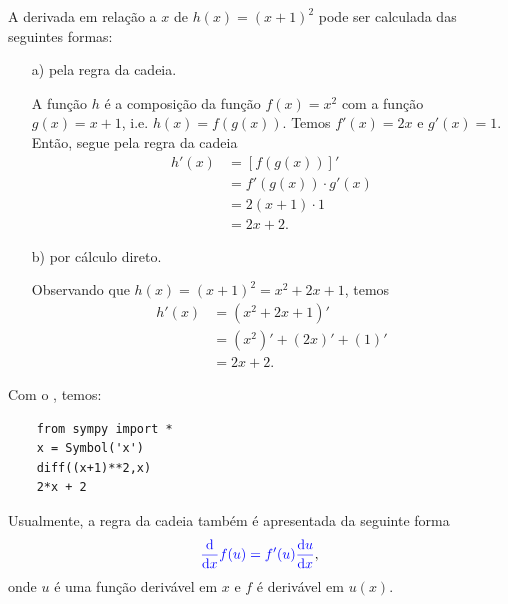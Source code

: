 \begin{ex}
  A derivada em relação a $x$ de $h(x) = (x+1)^2$ pode ser calculada das seguintes formas:
  \begin{enumerate}
  \item[a)] pela regra da cadeia.

    A função $h$ é a composição da função $f(x)=x^2$ com a função $g(x)=x+1$, i.e. $h(x) = f(g(x))$. Temos $f'(x)=2x$ e $g'(x)=1$. Então, segue pela regra da cadeia
    \begin{align}
      h'(x) &= [f(g(x))]' \\
            &= f'(g(x))\cdot g'(x) \\
            &= 2(x+1)\cdot 1 \\
            &= 2x+2.
    \end{align}

  \item[b)] por cálculo direto.

    Observando que $h(x)=(x+1)^2=x^2+2x+1$, temos
    \begin{align}
      h'(x) &= (x^2+2x+1)' \\
            &= (x^2)' + (2x)' + (1)' \\
            &= 2x + 2.
    \end{align}
  \end{enumerate}

  \ifispython
  Com o \sympy, temos:
  \begin{lstlisting}
    from sympy import *
    x = Symbol('x')
    diff((x+1)**2,x)
    2*x + 2
  \end{lstlisting}
  \fi  
\end{ex}

Usualmente, a regra da cadeia também é apresentada da seguinte forma
\begin{equation}\label{eq:deriv_regra_da_cadeia}
  {\color{blue}\frac{\mathrm{d}}{\mathrm{d}x}f(u) = f'(u)\frac{\mathrm{d}u}{\mathrm{d}x}},
\end{equation}
onde $u$ é uma função derivável em $x$ e $f$ é derivável em $u(x)$.

